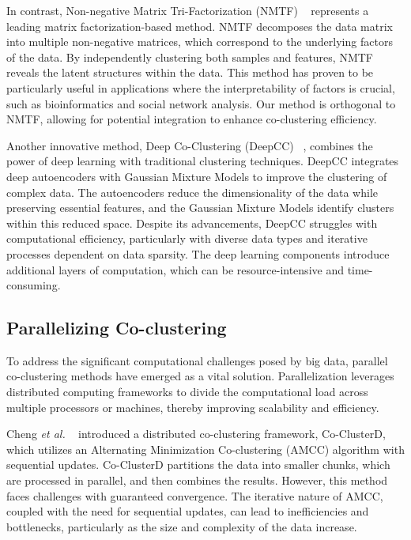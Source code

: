 \documentclass[journal]{IEEEtran}
\renewcommand{\cite}[1]{~\autocite{#1}}
\begin{document}
In contrast, Non-negative Matrix Tri-Factorization (NMTF) \cite{long2005CoclusteringBlockValue} represents a leading matrix factorization-based method. NMTF decomposes the data matrix into multiple non-negative matrices, which correspond to the underlying factors of the data. By independently clustering both samples and features, NMTF reveals the latent structures within the data. This method has proven to be particularly useful in applications where the interpretability of factors is crucial, such as bioinformatics and social network analysis. Our method is orthogonal to NMTF, allowing for potential integration to enhance co-clustering efficiency.

Another innovative method, Deep Co-Clustering (DeepCC) \cite{dongkuanxu2019DeepCoClustering}, combines the power of deep learning with traditional clustering techniques. DeepCC integrates deep autoencoders with Gaussian Mixture Models to improve the clustering of complex data. The autoencoders reduce the dimensionality of the data while preserving essential features, and the Gaussian Mixture Models identify clusters within this reduced space. Despite its advancements, DeepCC struggles with computational efficiency, particularly with diverse data types and iterative processes dependent on data sparsity. The deep learning components introduce additional layers of computation, which can be resource-intensive and time-consuming.

\subsection{Parallelizing Co-clustering}

To address the significant computational challenges posed by big data, parallel co-clustering methods have emerged as a vital solution. Parallelization leverages distributed computing frameworks to divide the computational load across multiple processors or machines, thereby improving scalability and efficiency.

Cheng \textit{et al.} \cite{cheng2015CoClusterDDistributedFramework} introduced a distributed co-clustering framework, Co-ClusterD, which utilizes an Alternating Minimization Co-clustering (AMCC) algorithm with sequential updates. Co-ClusterD partitions the data into smaller chunks, which are processed in parallel, and then combines the results. However, this method faces challenges with guaranteed convergence. The iterative nature of AMCC, coupled with the need for sequential updates, can lead to inefficiencies and bottlenecks, particularly as the size and complexity of the data increase.
\end{document}
